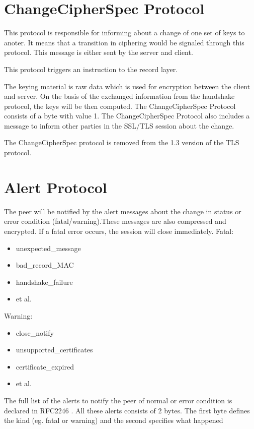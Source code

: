 \section{ChangeCipherSpec Protocol}
\label{sec:changeciphfer_protocol}
This protocol is responsible for informing about a change of one set of keys to anoter. It means that a transition in ciphering would be signaled through this protocol. This message is either sent by the server and client. 

This protocol triggers an instruction to the record layer.

The keying material is raw data which is used for encryption between the client and server. On the basis of the exchanged information from the handshake protocol, the keys will be then computed.
The ChangeCipherSpec Protocol consists of a byte with value 1.
The ChangeCipherSpec Protocol also includes a message to inform other parties in the SSL/TLS session about the change.   \cite{ms:overview}

The ChangeCipherSpec protocol is removed from the 1.3 version of the TLS protocol.

\section{Alert Protocol}
\label{sec:alert_protocol}
The peer will be notified by the alert messages about the change in status or error condition (fatal/warning).These messages are also compressed and encrypted. If a fatal error occurs, the session will close immediately.
Fatal:
\begin{itemize}
	\item unexpected\_message
	 \item bad\_record\_MAC
	 \item handshake\_failure 
	 \item et al.
\end{itemize}
	
Warning:
\begin{itemize}
\item close\_notify
\item unsupported\_certificates
\item certificate\_expired
\item et al.

\end{itemize}

The full list of the alerts to notify the peer of normal or error condition is declared in RFC2246 \cite{rfc2246}. All these alerts consists of 2 bytes. The first byte defines the kind (eg. fatal or warning) and the second specifies what happened \cite{W.Stalling} \cite{ms:overview}

